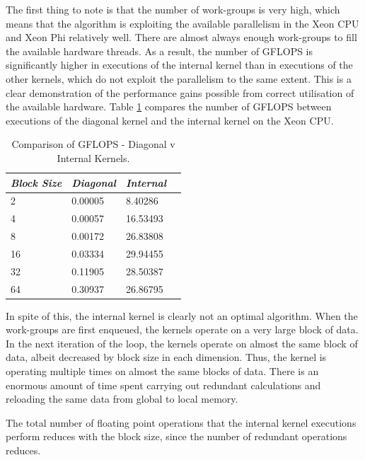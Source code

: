 \par{The first thing to note is that the number of work-groups is very high, which means
    that the algorithm is exploiting the available parallelism in the Xeon CPU and Xeon Phi relatively well. 
    There are almost always enough work-groups to fill the available hardware threads. 
    As a result, the number of GFLOPS is significantly higher in executions of the internal 
    kernel than in executions of the other kernels, which do not exploit the parallelism to the same extent. 
    This is a clear demonstration of the performance gains possible from correct utilisation of the available hardware. 
    Table \ref{tab:lu4} compares the number of GFLOPS between executions of the diagonal 
    kernel and the internal kernel on the Xeon CPU.}

\begin{table}[!h]
    \centering
    \begin{tabular}{| l | l | l | l |}
    \hline
    \emph{Block Size} & \emph{Diagonal} & \emph{Internal} \\ \hline
    2 & 0.00005 & 8.40286 \\ \hline
    4 & 0.00057 & 16.53493 \\ \hline
    8 & 0.00172 & 26.83808 \\ \hline
    16 & 0.03334 & 29.94455 \\ \hline
    32 & 0.11905 & 28.50387 \\ \hline
    64 & 0.30937 & 26.86795 \\ \hline
    \end{tabular}
    \caption{Comparison of GFLOPS - Diagonal v Internal Kernels.}
    \label{tab:lu4}
\end{table}

\par{In spite of this, the internal kernel is clearly not an optimal algorithm. 
    When the work-groups are first enqueued, the kernels operate on a very large block of data. 
    In the next iteration of the loop, the kernels operate on almost the same block of data, 
    albeit decreased by block size in each dimension. Thus, the kernel is operating multiple times 
    on almost the same blocks of data. There is an enormous amount of time spent carrying out redundant 
    calculations and reloading the same data from global to local memory.}

\par{The total number of floating point operations that the internal kernel executions perform 
    reduces with the block size, since the number of redundant operations reduces.}

